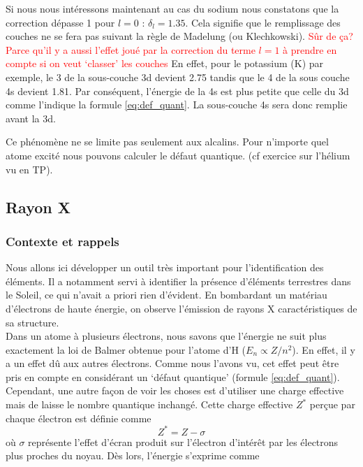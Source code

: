 Si nous nous intéressons maintenant au cas du sodium nous constatons que la correction dépasse 1 pour $l=0$ : $\delta_l = 1.35$. Cela signifie que le remplissage des couches ne se fera pas suivant la règle de Madelung (ou  Klechkowski). \textcolor{red}{Sûr de ça? Parce qu'il y a aussi l'effet joué par la correction du terme $l=1$ à prendre en compte si on veut `classer' les couches}
En effet, pour le potassium (K) par exemple, le 3 de la sous-couche 3d devient 2.75 tandis que le 4 de la sous couche 4s devient 1.81. Par conséquent, l’énergie de la 4s est plus petite que celle du 3d comme l'indique la formule \ref{eq:def_quant}. La sous-couche 4s sera donc remplie avant la 3d.

Ce phénomène ne se limite pas seulement aux alcalins. Pour  n'importe quel atome excité nous pouvons calculer le défaut quantique. (cf exercice sur l'hélium vu en TP).




\subsection{Rayon X}
\subsubsection{Contexte et rappels}


Nous allons ici développer un outil très important pour l'identification des éléments. Il a notamment servi à identifier la présence d'éléments terrestres dans le Soleil, ce qui n'avait a priori rien d'évident. En bombardant un matériau d'électrons de haute énergie, on observe l'émission de rayons X caractéristiques de sa structure.\\

Dans un atome à plusieurs électrons, nous savons que l'énergie ne suit plus exactement la loi de Balmer obtenue pour l'atome d'H ($E_n \propto Z/n^2$). En effet, il y a un effet dû aux autres électrons. Comme nous l'avons vu, cet effet peut être pris en compte en considérant un `défaut quantique' (formule \ref{eq:def_quant}). Cependant, une autre façon de voir les choses est d'utiliser une charge effective mais de laisse le nombre quantique inchangé. Cette charge effective $Z^{*}$ perçue par chaque électron est définie comme \[ Z^{*}=Z-\sigma \] où $\sigma$ représente l'effet d'écran produit sur l'électron d'intérêt par les électrons plus proches du noyau. Dès lors, l'énergie s'exprime comme

